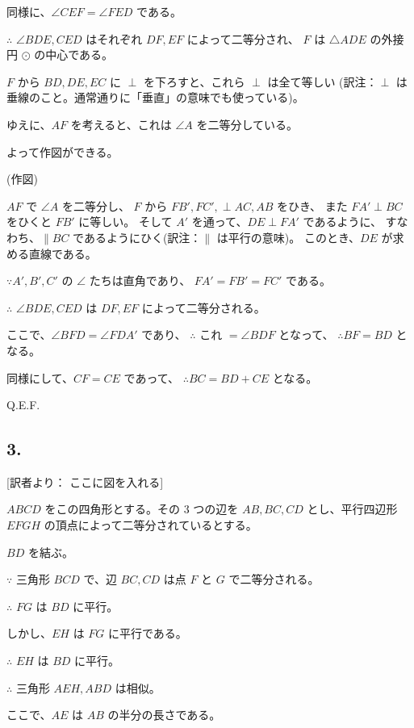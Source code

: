 同様に、$\angle CEF = \angle FED$ である。

$\therefore$ $\angle BDE, CED$ はそれぞれ $DF, EF$ によって二等分され、
$F$ は $\triangle ADE$ の外接円 $\odot $ の中心である。

$F$ から $BD, DE, EC$ に $\perp$ を下ろすと、これら $\perp$ は全て等しい
(訳注：$\perp$ は垂線のこと。通常通りに「垂直」の意味でも使っている)。

ゆえに、$AF$ を考えると、これは $\angle A$ を二等分している。

よって作図ができる。

\begin{center}(作図)\end{center}

$AF$ で $\angle A$ を二等分し、
$F$ から $FB', FC', \perp AC, AB$ をひき、
また $FA' \perp BC$ をひくと $FB'$ に等しい。
そして $A'$ を通って、$DE \perp FA'$ であるように、
すなわち、$\parallel BC$ であるようにひく(訳注：$\parallel$ は平行の意味)。
このとき、$DE$ が求める直線である。

$\because A', B', C'$ の $\angle$ たちは直角であり、
$FA' = FB' = FC'$ である。

$\therefore$ $\angle BDE, CED$ は $DF, EF$ によって二等分される。

ここで、$\angle BFD = \angle FDA'$ であり、
$\therefore$ これ $= \angle BDF$ となって、
$\therefore BF = BD$ となる。

同様にして、$CF = CE$ であって、
$\therefore BC = BD + CE$ となる。

Q.E.F.

\subsection*{3.}

[訳者より： ここに図を入れる]

$ABCD$ をこの四角形とする。その 3 つの辺を $AB, BC, CD$
とし、平行四辺形 $EFGH$ の頂点によって二等分されているとする。

$BD$ を結ぶ。

$\because$
三角形 $BCD$ で、辺 $BC, CD$ は点 $F$ と $G$ で二等分される。

$\therefore$
$FG$ は $BD$ に平行。

しかし、$EH$ は $FG$ に平行である。

$\therefore$
$EH$ は $BD$ に平行。

$\therefore$
三角形 $AEH, ABD$ は相似。

ここで、$AE$ は $AB$ の半分の長さである。

